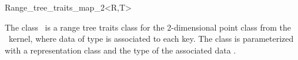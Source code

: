 \begin{ccRefClass} {Range_tree_traits_map_2<R,T>}

\ccDefinition
The class \ccClassName\ is a range tree traits class for the
2-dimensional point class from the \cgal\ kernel, where data of
type  is associated to each key. The class is
parameterized with a representation class  and the type of
the associated data .


\ccTypes
{}


\end{ccRefClass} 
